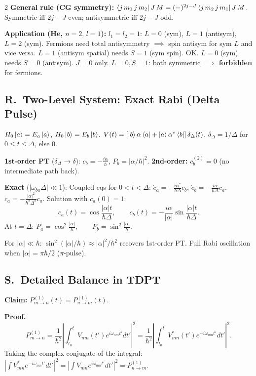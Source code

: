 \documentclass[9pt,a4paper]{article} %
\begin{document}
\begin{multicols}{2}
\textbf{General rule (CG symmetry):} $\bra{j\,m_1\,j\,m_2}{J\,M}=(-)^{2j-J}\bra{j\,m_2\,j\,m_1}{J\,M}$.\;
Symmetric iff $2j-J$ even; antisymmetric iff $2j-J$ odd.

\textbf{Application (He, $n{=}2,\,l{=}1$):}
$l_1{=}l_2{=}1$: $L=0$ (sym), $L=1$ (antisym), $L=2$ (sym).
Fermions need total antisymmetry $\implies$ spin antisym for sym $L$ and vice versa.
$L{=}1$ (antisym spatial) needs $S{=}1$ (sym spin). OK.
$L{=}0$ (sym) needs $S{=}0$ (antisym). $J=0$ only.
$L{=}0,S{=}1$: both symmetric $\implies$ \textbf{forbidden} for fermions.

\subsection{R.\ Two-Level System: Exact Rabi (Delta Pulse)}
$H_0\ket{a}=E_a\ket{a}$,\; $H_0\ket{b}=E_b\ket{b}$.\;
$V(t)=[\ket{b}\alpha\bra{a}+\ket{a}\alpha^*\bra{b}]\,\delta_\Delta(t)$,\;
$\delta_\Delta=1/\Delta$ for $0\le t\le\Delta$, else $0$.

\textbf{1st-order PT} ($\delta_\Delta\to\delta$): $c_b=-\frac{i\alpha}{\hbar}$,\; $P_b=|\alpha/\hbar|^2$.
\textbf{2nd-order:} $c_b^{(2)}=0$ (no intermediate path back).

\textbf{Exact} ($|\omega_{ba}\Delta|\ll 1$):
Coupled eqs for $0<t<\Delta$:\;
$\dot c_a=-\frac{i\alpha^*}{\hbar\Delta}c_b$,\; $\dot c_b=-\frac{i\alpha}{\hbar\Delta}c_a$.
$\ddot c_a=-\frac{|\alpha|^2}{\hbar^2\Delta^2}c_a$.\; Solution with $c_a(0)=1$:
\[
c_a(t)=\cos\!\frac{|\alpha|t}{\hbar\Delta},\qquad
c_b(t)=-\frac{i\alpha}{|\alpha|}\sin\!\frac{|\alpha|t}{\hbar\Delta}.
\]
At $t=\Delta$:
$\boxed{P_a=\cos^2\!\frac{|\alpha|}{\hbar},\qquad P_b=\sin^2\!\frac{|\alpha|}{\hbar}}$.

For $|\alpha|\ll\hbar$: $\sin^2(|\alpha|/\hbar)\approx|\alpha|^2/\hbar^2$ recovers 1st-order PT.\;
Full Rabi oscillation when $|\alpha|=\pi\hbar/2$ ($\pi$-pulse).

\subsection{S.\ Detailed Balance in TDPT}
\textbf{Claim:} $P^{(1)}_{m\to n}(t)=P^{(1)}_{n\to m}(t)$.

\textbf{Proof.}
\[
P^{(1)}_{m\to n}=\frac{1}{\hbar^2}\left|\int_{t_0}^t V_{nm}(t')e^{i\omega_{nm}t'}dt'\right|^2
=\frac{1}{\hbar^2}\left|\int_{t_0}^t V_{mn}^*(t')e^{-i\omega_{mn}t'}dt'\right|^2.
\]
Taking the complex conjugate of the integral:
$\left|\int V_{mn}^* e^{-i\omega_{mn}t'}dt'\right|^2=\left|\int V_{mn} e^{i\omega_{mn}t'}dt'\right|^2=P^{(1)}_{n\to m}$.\;\checkmark


\end{multicols}
\end{document}
